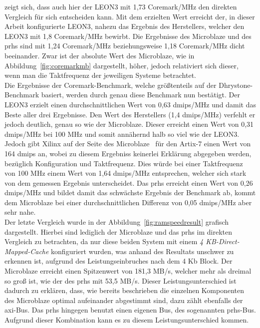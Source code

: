 zeigt sich, dass auch hier der LEON3 mit 1,73 Coremark/MHz den direkten Vergleich für sich entscheiden kann. Mit dem erzielten Wert erreicht der, in dieser Arbeit
konfigurierte LEON3, nahezu das Ergebnis des Herstellers, welcher den LEON3 mit 1,8 Coremark/MHz bewirbt.\cite{leon} Die Ergebnisse des Microblaze und des \ac{prhs}
sind mit 1,24 Coremark/MHz beziehungsweise 1,18 Coremark/MHz dicht beeinander. Zwar ist der absolute Wert des Microblaze, wie in Abbildung~\ref{fig:coremarkmb} dargestellt,
höher, jedoch relativiert sich dieser, wenn man die Taktfrequenz der jeweiligen Systeme betrachtet. \\
Die Ergebnisse der Coremark-Benchmark, welche größtenteils auf der
Dhrystone- Benchmark basiert, werden durch genau diese Benchmark nun bestätigt. Der LEON3 erzielt einen
durchschnittlichen Wert von 0,63 \ac{dmips}/MHz und damit das Beste aller drei Ergebnisse. Den Wert des Herstellers (1,4 \ac{dmips}/MHz) verfehlt er jedoch deutlich,
genau so wie der Microblaze. Dieser erreicht einen Wert von 0,31 \ac{dmips}/MHz bei 100 MHz und somit annähernd halb so viel wie der LEON3. Jedoch gibt Xilinx
auf der Seite des Microblaze~\cite{microblaze} für den Artix-7 einen Wert von 164 \ac{dmips} an, wobei zu diesem Ergebniss keinerlei Erklärung abgegeben werden, bezüglich
Konfiguration und Taktfrequenz. Dies würde bei einer Taktfrequenz von 100 MHz einem Wert von 1,64 \ac{dmips}/MHz entsprechen, welcher sich stark von dem gemessen
Ergebnis unterscheidet. Das \ac{prhs} erreicht einen Wert von 0,26 \ac{dmips}/MHz und bildet damit das schwächste Ergebnis der Benchmark ab, kommt dem Microblaze
bei einer durchschnittlichen Differenz von 0,05 \ac{dmips}/MHz aber sehr nahe.\\
Der letzte Vergleich wurde in der Abbildung~\ref{fig:ramspeedresult} grafisch dargestellt. Hierbei sind lediglich der Microblaze und das \ac{prhs} im direkten Vergleich
zu betrachten, da nur diese beiden System mit einem \emph{4 KB-Direct-Mapped-Cache} konfiguriert wurden, was anhand des Resultats unschwer zu erkennen ist, aufgrund
des Leistungseinbruches nach dem 4 Kb Block. Der Microblaze erreicht einen Spitzenwert von 181,3 MB/s, welcher mehr als dreimal so groß ist, wie der des \ac{prhs}
mit 53,5 MB/s. Dieser Leistungsunterschied ist dadurch zu erklären, dass, wie bereits beschrieben die einzelnen Komponenten des Microblaze optimal aufeinander
abgestimmt sind, dazu zählt ebenfalls der \ac{axi}-Bus. Das \ac{prhs} hingegen benutzt einen eigenen Bus, des sogenannten \ac{prhs}-Bus. Aufgrund dieser Kombination
kann es zu diesem Leistungsunterschied kommen.
